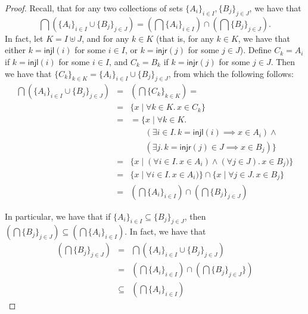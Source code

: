 \documentclass[a4paper,UKenglish]{article}%
\newif\ifdraft
\newcommand{\ac}[1]{\ifdraft{}{\color{blue}#1}\else{}\fi}
\theoremstyle{plain}
\begin{document}
\begin{proof}
Recall, that for any two collections of sets $\{A_i\}_{i \in I}, \{B_j\}_{j \in J}$, 
we have that 
\[
\bigcap \left( \{ A_i \}_{i \in I} \cup \{B_j \}_{j \in J} \right) = \left( \bigcap \{ A_i \}_{i \in I} \right) \cap \left( \bigcap \{B_j\}_{j \in J} \right).
\]
In fact, let $K = I \uplus J$, and for any $k \in K$ (that is, for any $k \in K$, we have that either $k = \mathsf{injl}(i)$ for some $i \in I$, 
or $k = \mathsf{injr}(j)$ for some $j \in J$). Define $C_k = A_i$ if $k = \mathsf{injl}(i)$ for some $i \in I$, and 
$C_k = B_k$ if $k = \mathsf{injr}(j)$ for some $j \in J$. Then we have that $\{C_k\}_{k \in K} = \{A_i\}_{i \in I} \cup \{B_j\}_{j \in J}$, 
from which the following follows:
\[
\begin{array}{lcl}
\bigcap \left( \{ A_i \}_{i \in I} \cup \{B_j \}_{j \in J} \right) &=& \left( \bigcap \{ C_k \}_{k \in K} \right) = \\
&=& \{ x \mid \forall k \in K.\, x \in C_k\}\\
&=& = \{x \mid \forall k \in K.\,\\
&& \phantom{( x \mid {}} (\exists i \in I.\, k = \mathsf{injl}(i) \implies x \in A_i) 
\wedge {}\\ 
&&\phantom{(x \mid {} }(\exists j.\, k = \mathsf{injr}(j) \in J \implies x \in B_j) \}\\
&=& \{ x \mid (\forall i \in I.\, x \in A_i) \wedge (\forall j \in J).\, x \in B_j) \}\\
&=& \{ x \mid \forall i \in I.\, x \in A_i) \} \cap \{ x \mid \forall j \in J.\, x \in B_j \}\\
&=& \left( \bigcap \{A_i\}_{i \in I} \right) \cap \left( \bigcap \{B_j\}_{j \in J} \right)
\end{array}
\]
\ac{Here I have to be clear about notation: the union above refers to a union of two sets, whose 
elements are sets of sets. That is, if $i = 1, \cdots, n$, $j = 1, \cdots, m$, then 
$\{A_1, \cdots, A_n\} \cup \{B_1, \cdots, B_m\} = \{A_1, \cdots, A_n, B_1, \cdots, B_m\}$. 
In contrast, the $\bigcap{}$ operator refers to the intersections of all sets contained within a set 
of sets, i.e. $\bigcap \{A_1, \cdots, A_n,  B_1, \cdots B_m\} = A_1 \cap \cdots \cap A_n \cap B_1 \cap \cdots B_n$.}

In particular, we have that if $\{A_i\}_{i \in I} \subseteq \{B_j\}_{j \in J}$, then 
$\left( \bigcap \{B_j\}_{j \in J} \right) \subseteq \left( \bigcap \{A_i\}_{i \in I} \right)$. 
In fact, we have that 
\[
\begin{array}{lcl}
\left(\bigcap \{B_j\}_{j \in J} \right) &=& \bigcap \left( \{A_i\}_{i \in I} \cup \{B_j\}_{j \in J} \right)\\
&=& \left( \bigcap \{ A_i \}_{i \in I} \right) \cap \left( \bigcap \{ B_j \}_{j \in J} \} \right)\\
&\subseteq& \left( \bigcap \{A_i\}_{i \in I} \right)
\end{array}
\]


\end{proof}
\end{document}
